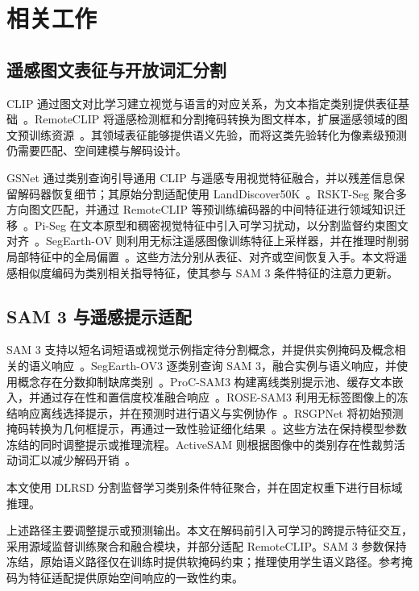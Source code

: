 \section{相关工作}

\subsection{遥感图文表征与开放词汇分割}
CLIP 通过图文对比学习建立视觉与语言的对应关系，为文本指定类别提供表征基础~\cite{radfordLearningTransferableVisual2021}。RemoteCLIP 将遥感检测框和分割掩码转换为图文样本，扩展遥感领域的图文预训练资源~\cite{liuRemoteCLIPVisionLanguage2024}。其领域表征能够提供语义先验，而将这类先验转化为像素级预测仍需要匹配、空间建模与解码设计。

GSNet 通过类别查询引导通用 CLIP 与遥感专用视觉特征融合，并以残差信息保留解码器恢复细节；其原始分割适配使用 LandDiscover50K~\cite{yeOpenVocabularyRemoteSensing2025}。RSKT-Seg 聚合多方向图文匹配，并通过 RemoteCLIP 等预训练编码器的中间特征进行领域知识迁移~\cite{liExploringEfficientOpenVocabulary2026}。Pi-Seg 在文本原型和稠密视觉特征中引入可学习扰动，以分割监督约束图文对齐~\cite{liPerturbationRegularizedOpenVocabularyRemote2026}。SegEarth-OV 则利用无标注遥感图像训练特征上采样器，并在推理时削弱局部特征中的全局偏置~\cite{liSegEarthOVTrainingFreeOpenVocabulary2025}。这些方法分别从表征、对齐或空间恢复入手。本文将遥感相似度编码为类别相关指导特征，使其参与 SAM 3 条件特征的注意力更新。

\subsection{SAM 3 与遥感提示适配}
SAM 3 支持以短名词短语或视觉示例指定待分割概念，并提供实例掩码及概念相关的语义响应~\cite{carionSAM3Segment2026}。SegEarth-OV3 逐类别查询 SAM 3，融合实例与语义响应，并使用概念存在分数抑制缺席类别~\cite{liSegEarthOV3ExploringSAM2026}。ProC-SAM3 构建离线类别提示池、缓存文本嵌入，并通过存在性和置信度校准融合响应~\cite{songPromptCalibratedSAM32026}。ROSE-SAM3 利用无标签图像上的冻结响应离线选择提示，并在预测时进行语义与实例协作~\cite{songROSESAM3ResponseOrientedPrompt2026}。RSGPNet 将初始预测掩码转换为几何框提示，再通过一致性验证细化结果~\cite{wangRSGPNetGeometricPrompting2026}。这些方法在保持模型参数冻结的同时调整提示或推理流程。ActiveSAM 则根据图像中的类别存在性裁剪活动词汇以减少解码开销~\cite{tienActiveSAMFastAccurate2026}。

本文使用 DLRSD 分割监督学习类别条件特征聚合，并在固定权重下进行目标域推理。

上述路径主要调整提示或预测输出。本文在解码前引入可学习的跨提示特征交互，采用源域监督训练聚合和融合模块，并部分适配 RemoteCLIP。SAM 3 参数保持冻结，原始语义路径仅在训练时提供软掩码约束；推理使用学生语义路径。参考掩码为特征适配提供原始空间响应的一致性约束。


